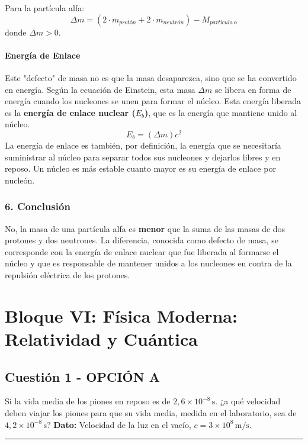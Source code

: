 Para la partícula alfa:
$$ \Delta m = (2 \cdot m_{protón} + 2 \cdot m_{neutrón}) - M_{partícula\,\alpha} $$
donde $\Delta m > 0$.

\paragraph{Energía de Enlace}
Este "defecto" de masa no es que la masa desaparezca, sino que se ha convertido en energía. Según la ecuación de Einstein, esta masa $\Delta m$ se libera en forma de energía cuando los nucleones se unen para formar el núcleo. Esta energía liberada es la \textbf{energía de enlace nuclear ($E_b$)}, que es la energía que mantiene unido al núcleo.
$$ E_b = (\Delta m) c^2 $$
La energía de enlace es también, por definición, la energía que se necesitaría suministrar al núcleo para separar todos sus nucleones y dejarlos libres y en reposo. Un núcleo es más estable cuanto mayor es su energía de enlace por nucleón.

\subsubsection*{6. Conclusión}
\begin{cajaconclusion}
No, la masa de una partícula alfa es \textbf{menor} que la suma de las masas de dos protones y dos neutrones. La diferencia, conocida como defecto de masa, se corresponde con la energía de enlace nuclear que fue liberada al formarse el núcleo y que es responsable de mantener unidos a los nucleones en contra de la repulsión eléctrica de los protones.
\end{cajaconclusion}

\newpage

\section{Bloque VI: Física Moderna: Relatividad y Cuántica}
\label{sec:moderna_cuantica_2001_sep_ext}

\subsection{Cuestión 1 - OPCIÓN A}
\label{subsec:6A_2001_sep_ext}

\begin{cajaenunciado}
Si la vida media de los piones en reposo es de $2,6\times10^{-8}\,\text{s}$. ¿a qué velocidad deben viajar los piones para que su vida media, medida en el laboratorio, sea de $4,2\times10^{-8}\,\text{s}$?
\textbf{Dato:} Velocidad de la luz en el vacío, $c=3\times10^{8}\,\text{m/s}$.
\end{cajaenunciado}
\hrule


